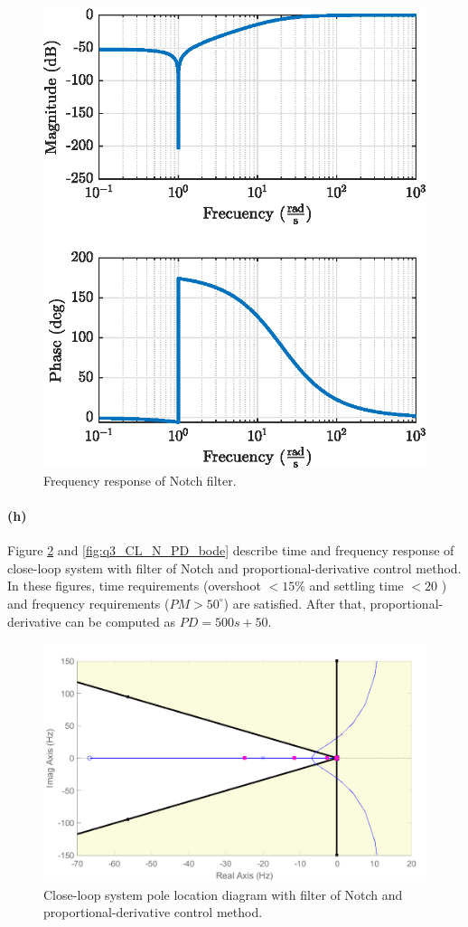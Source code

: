 \begin{figure}[h!]
	\centering
	\includegraphics{images/question3/q3_bode_N.eps}
	\caption{Frequency response of Notch filter.}
	\label{fig:notch_filter}
\end{figure}

\newpage
\paragraph{(h)} Figure \ref{fig:q3_CL_N_PD_rlocus} and \ref{fig:q3_CL_N_PD_bode} describe time and frequency response of close-loop system with filter of Notch and proportional-derivative control method. In these figures, time requirements (overshoot $<15\%$ and settling time $<20$ ) and frequency requirements ($PM>50^{\circ}$) are satisfied. After that, proportional-derivative can be computed as $PD = 500 s + 50$. 


\begin{figure}[h!]
	\centering
	\includegraphics[width=.7\textwidth]{images/question3/sisotool_rlocus.pdf}
	\caption{Close-loop system pole location diagram with filter of Notch and proportional-derivative control method.}
	\label{fig:q3_CL_N_PD_rlocus}
\end{figure}

